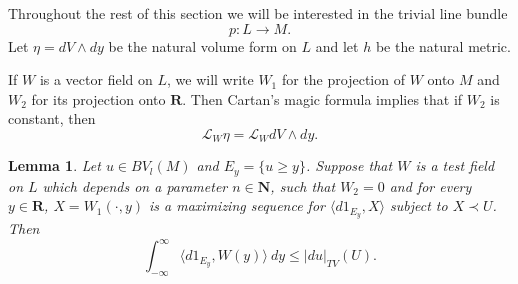 \documentclass[reqno,12pt,letterpaper]{amsart}
\newcommand{\NN}{\mathbf{N}}
\newcommand{\RR}{\mathbf{R}}
\newtheorem{lemma}[theorem]{Lemma}
\theoremstyle{definition}
\numberwithin{equation}{section}
\begin{document}
Throughout the rest of this section we will be interested in the trivial line bundle
$$p: L \to M.$$
Let $\eta = dV \wedge dy$ be the natural volume form on $L$ and let $h$ be the natural metric.

If $W$ is a vector field on $L$, we will write $W_1$ for the projection of $W$ onto $M$ and $W_2$ for its projection onto $\RR$.
Then Cartan's magic formula implies that if $W_2$ is constant, then
\begin{equation}
\label{Lie derivative computation}
\mathcal L_W\eta = \mathcal L_WdV \wedge dy.
\end{equation}

\begin{lemma}\label{coarea converse}
Let $u \in BV_l(M)$ and $E_y = \{u \geq y\}$.
Suppose that $W$ is a test field on $L$ which depends on a parameter $n \in \NN$, such that $W_2 = 0$ and for every $y \in \RR$, $X = W_1(\cdot, y)$ is a maximizing sequence for $\langle d 1_{E_y}, X\rangle$ subject to $X \prec U$.
Then
$$\int_{-\infty}^\infty \langle d 1_{E_y}, W(y)\rangle ~dy \leq |d u|_{TV}(U).$$
\end{lemma}
\end{document}
